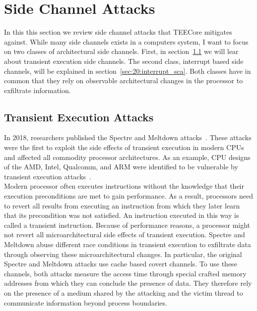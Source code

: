 \section{Side Channel Attacks}
\label{sec:20:attacks}
In this this section we review side channel attacks that TEECore mitigates
against. While many side channels exists in a computers system, I want to focus
on two classes of architectural side channels. First, in
section~\ref{sec:20:transientattacks} we will lear about transient execution
side channels. The second class, interrupt based side channels, will be
explained in section~\ref{sec:20:interrupt_sca}. Both classes have in common
that they rely on observable architectural changes in the processor to
exfiltrate information.

\subsection{Transient Execution Attacks}
\label{sec:20:transientattacks}
In 2018, researchers published the Spectre and Meltdown
attacks~\cite{kocher_spectre_2020, lipp_meltdown_2020}. These attacks were the
first to exploit the side effects of transient execution in modern CPUs and
affected all commodity processor architectures. As an example, CPU designs of
the AMD, Intel, Qualcomm, and ARM were identified to be vulnerable by transient
execution attacks~\cite{wikner2022retbleed,moghimi_downfall_2023,ragab_ghostrace_2024}.\\

Modern processor often executes instructions without the knowledge that their
execution preconditions are met to gain performance. As a result, processors
need to revert all results from executing an instruction from which they later
learn that its precondition was not satisfied. An instruction executed in this
way is called a transient instruction. Because of performance reasons, a
processor might not revert all microarchitectural side effects of transient
execution. Spectre and Meltdown abuse different race conditions in transient
execution to exfiltrate data through observing these microarchitectural changes.
In particular, the original Spectre and Meltdown attacks use cache based covert
channels. To use these channels, both attacks measure the access time through
special crafted memory addresses from which they can conclude the presence of
data. They therefore rely on the presence of a medium shared by the attacking
and the victim thread to communicate information beyond process boundaries. \\

